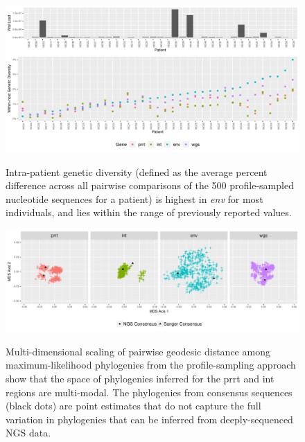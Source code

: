 \documentclass[letterpaper]{article}
\begin{document}
\printbibliography

\begin{figure}[p!]
	\caption{Intra-patient genetic diversity (defined as the average percent difference across all pairwise comparisons of the 500 profile-sampled nucleotide sequences for a patient) is highest in \emph{env} for most individuals, and lies within the range of previously reported values.}
	\centering
	\includegraphics[width=\linewidth]{Figure1}
	\label{fig1}
\end{figure}

\begin{figure}[p!]
	\caption{Multi-dimensional scaling of pairwise geodesic distance among maximum-likelihood phylogenies from the profile-sampling approach show that the space of phylogenies inferred for the prrt and int regions are multi-modal. The phylogenies from consensus sequences (black dots) are point estimates that do not capture the full variation in phylogenies that can be inferred from deeply-sequenced NGS data.}
	\centering
	\includegraphics[width=\linewidth]{Figure2}
	\label{fig2}
\end{figure}
	
\end{document}
